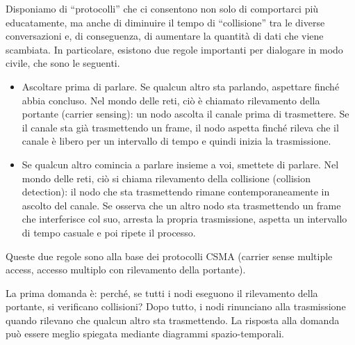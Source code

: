 Disponiamo di “protocolli” che ci consentono non solo di comportarci più educatamente, ma anche di diminuire il tempo di “collisione” tra le diverse conversazioni e, di conseguenza, di aumentare la quantità di dati che viene scambiata. In particolare, esistono due regole importanti per dialogare in modo civile, che sono le seguenti. 
\begin{itemize}
    \item Ascoltare prima di parlare. Se qualcun altro sta parlando, aspettare finché abbia concluso. Nel mondo delle reti, ciò è chiamato rilevamento della portante (carrier sensing): un nodo ascolta il canale prima di trasmettere. Se il canale sta già trasmettendo un frame, il nodo aspetta finché rileva che il canale è libero per un intervallo di tempo e quindi inizia la trasmissione. 
    \item Se qualcun altro comincia a parlare insieme a voi, smettete di parlare. Nel mondo delle reti, ciò si chiama rilevamento della collisione (collision detection): il nodo che sta trasmettendo rimane contemporaneamente in ascolto del canale. Se osserva che un altro nodo sta trasmettendo un frame che interferisce col suo, arresta la propria trasmissione, aspetta un intervallo di tempo casuale e poi ripete il processo.
\end{itemize}

Queste due regole sono alla base dei protocolli CSMA (carrier sense multiple access, accesso multiplo con rilevamento della portante).

La prima domanda è: perché, se tutti i nodi eseguono il rilevamento della portante,
si verificano collisioni? Dopo tutto, i nodi rinunciano alla trasmissione quando rilevano che qualcun altro sta trasmettendo. La risposta alla domanda può essere meglio
spiegata mediante diagrammi spazio-temporali. 

